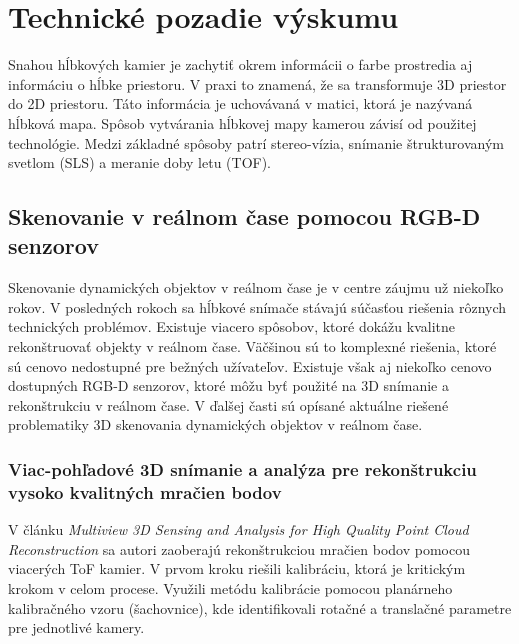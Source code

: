 
\chapter{Technické pozadie výskumu} 
\label{kap:technické_pozadie}
\pagestyle{fancy}
\fancyhf{}
\fancyfoot[CE,CO]{\thepage}
\renewcommand{\footrulewidth}{1pt}

Snahou hĺbkových kamier je zachytiť okrem informácii o farbe prostredia aj informáciu o hĺbke priestoru. V praxi to znamená, že sa transformuje 3D priestor do 2D priestoru. Táto informácia je uchovávaná v matici, ktorá je nazývaná hĺbková mapa. Spôsob vytvárania hĺbkovej mapy kamerou závisí od použitej technológie. Medzi základné spôsoby patrí stereo-vízia, snímanie štrukturovaným svetlom (SLS) a meranie doby letu (TOF).

\section{Skenovanie v reálnom čase pomocou \mbox{RGB-D} senzorov}

Skenovanie dynamických objektov v reálnom čase je v centre záujmu už niekoľko rokov. V posledných rokoch sa hĺbkové snímače stávajú súčasťou riešenia rôznych technických problémov. Existuje viacero spôsobov, ktoré dokážu kvalitne rekonštruovať objekty v reálnom čase. Väčšinou sú to komplexné riešenia, ktoré sú cenovo nedostupné pre bežných užívateľov. Existuje však aj niekoľko cenovo dostupných RGB-D senzorov, ktoré môžu byť použité na 3D snímanie a rekonštrukciu v reálnom čase. V ďalšej časti sú opísané aktuálne riešené problematiky 3D skenovania dynamických objektov v reálnom čase. 

\newpage
\subsection{Viac-pohľadové 3D snímanie a analýza pre rekonštrukciu vysoko kvalitných mračien bodov}

V článku \textit{Multiview 3D Sensing and Analysis for High Quality Point Cloud Reconstruction} sa autori zaoberajú rekonštrukciou mračien bodov pomocou viacerých ToF kamier. 
V prvom kroku riešili kalibráciu, ktorá je kritickým krokom v celom procese. Využili metódu kalibrácie pomocou planárneho kalibračného vzoru (šachovnice), kde identifikovali rotačné a translačné parametre pre jednotlivé kamery. 

